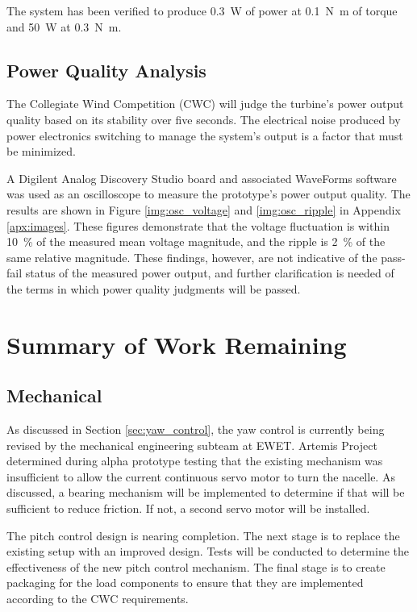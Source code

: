 \documentclass[11pt,letterpaper,conference]{IEEEtran}
\begin{document}
The system has been verified to produce \qty{.3}{\W} of power at
\qty{.1}{\newton\m} of torque and \qty{50}{\W} at \qty{.3}{\newton\m}.

\subsection{Power Quality Analysis}

The Collegiate Wind Competition (CWC) will judge the turbine's power output
quality based on its stability over five seconds. The electrical noise produced
by power electronics switching to manage the system's output is a factor that
must be minimized.

A Digilent Analog Discovery Studio board and associated WaveForms software was
used as an oscilloscope to measure the prototype's power output quality. The
results are shown in Figure \ref{img:osc_voltage} and \ref{img:osc_ripple} in
Appendix \ref{apx:images}. These figures demonstrate that the voltage
fluctuation is within \qty{10}{\percent} of the measured mean voltage
magnitude, and the ripple is \qty{2}{\percent} of the same relative magnitude.
These findings, however, are not indicative of the pass-fail status of the
measured power output, and further clarification is needed of the terms in which
power quality judgments will be passed.

\section{Summary of Work Remaining}
\subsection{Mechanical}


As discussed in Section \ref{sec:yaw_control}, the yaw control is currently
being revised by the mechanical engineering subteam at EWET. Artemis Project
determined during alpha prototype testing that the existing mechanism was
insufficient to allow the current continuous servo motor to turn the nacelle.
As discussed, a bearing mechanism will be implemented to determine if that
will be sufficient to reduce friction. If not, a second servo motor will be
installed.

The pitch control design is nearing completion. The next stage is to replace
the existing setup with an improved design. Tests will be conducted to
determine the effectiveness of the new pitch control mechanism. The final stage
is to create packaging for the load components to ensure that they are
implemented according to the CWC requirements.
\end{document}
